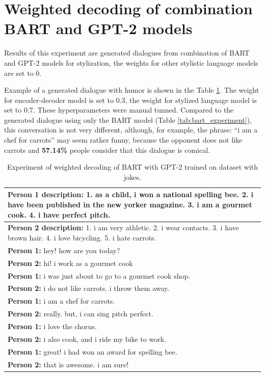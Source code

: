 \section{Weighted decoding of combination BART and GPT-2 models}
Results of this experiment are generated dialogues from combination of BART and GPT-2 models for stylization, the weights for other stylistic language models are set to 0.

Example of a generated dialogue with humor is shown in the Table \ref{tab:combo_bart_gpt2_jokes}. The weight for encoder-decoder model is set to 0.3, the weight for stylized language model is set to 0.7. These hyperparameters were manual tunned. Compared to the generated dialogue using only the BART model (Table \ref{tab:bart_experiment}), this conversation is not very different, although, for example, the phrase: ``i am a chef for carrots'' may seem rather funny, because the opponent does not like carrots and \textbf{57.14\%} people consider that this dialogue is comical.

\begin{table}
\centering
 \begin{tabular}{|p{14cm}|} 
 \hline
 \textbf{Person 1 description:} 1. as a child, i won a national spelling bee. 2. i have been published in the new yorker magazine. 3. i am a gourmet cook. 4. i have perfect pitch. \\
 \hline
 \textbf{Person 2 description:} 1. i am very athletic. 2. i wear contacts. 3. i have brown hair. 4. i love bicycling. 5. i hate carrots. \\
 \hline
 \textbf{Person 1:} hey! how are you today? \\ 
 \textbf{Person 2:} hi! i work as a gourmet cook \\
 \textbf{Person 1:} i was just about to go to a gourmet cook shop. \\
 \textbf{Person 2:} i do not like carrots. i throw them away. \\
 \textbf{Person 1:} i am a chef for carrots.\\
 \textbf{Person 2:} really. but, i can sing pitch perfect. \\
 \textbf{Person 1:} i love the chorus. \\
 \textbf{Person 2:} i also cook, and i ride my bike to work. \\
 \textbf{Person 1:} great! i had won an award for spelling bee.\\
 \textbf{Person 2:} that is awesome. i am sure! \\
 \hline
 \end{tabular}
 \caption{Experiment of weighted decoding of BART with GPT-2 trained on dataset with jokes.}
\label{tab:combo_bart_gpt2_jokes}
\end{table}

